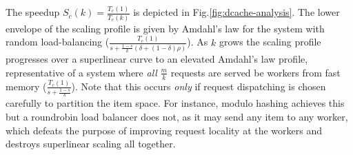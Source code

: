 The speedup $S_c(k)=\frac{T_c(1)}{T_c(k)}$ is depicted in Fig.\ref{fig:dcache-analysis}. The lower envelope of the scaling profile is given by Amdahl's law for the system with random load-balancing ($\frac{T_c(1)}{s + \frac{1-s}{k}(\delta + (1-\delta)\rho)}$). As $k$ grows the scaling profile progresses over a superlinear curve to an elevated Amdahl's law profile, representative of a system where \emph{all} $\frac{m}{k}$ requests are served be workers from fast memory ($\frac{T_c(1)}{s + \frac{1-s}{k}}$). Note that this occurs \emph{only} if request dispatching is chosen carefully to partition the item space. For instance, modulo hashing achieves this but a roundrobin load balancer does not, as it may send any item to any worker, which defeats the purpose of improving request locality at the workers and destroys superlinear scaling all together. %



